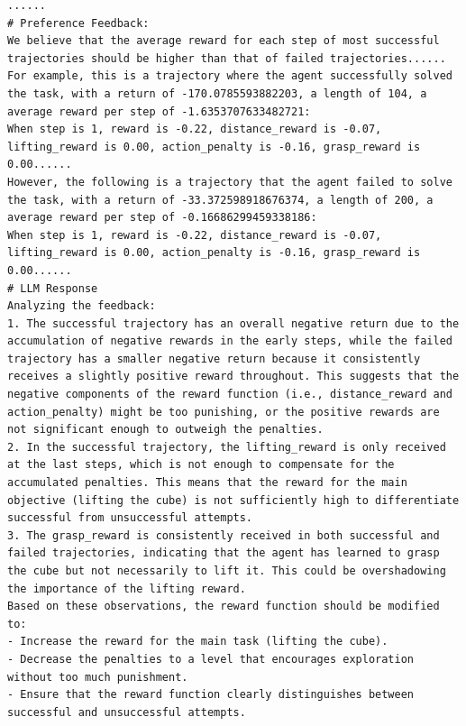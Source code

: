 \documentclass{article}
\theoremstyle{plain}
\theoremstyle{definition}
\theoremstyle{remark}
\begin{document}
\begin{table}[!ht]
\centering
\caption{The code generated after $2$ introspection iteration on \textit{Lift Cube}.}
\begin{tcolorbox}
\begin{lstlisting}[breaklines]
......
# Preference Feedback:
We believe that the average reward for each step of most successful trajectories should be higher than that of failed trajectories......
For example, this is a trajectory where the agent successfully solved the task, with a return of -170.0785593882203, a length of 104, a average reward per step of -1.6353707633482721:
When step is 1, reward is -0.22, distance_reward is -0.07, lifting_reward is 0.00, action_penalty is -0.16, grasp_reward is 0.00......
However, the following is a trajectory that the agent failed to solve the task, with a return of -33.372598918676374, a length of 200, a average reward per step of -0.16686299459338186:
When step is 1, reward is -0.22, distance_reward is -0.07, lifting_reward is 0.00, action_penalty is -0.16, grasp_reward is 0.00......
# LLM Response
Analyzing the feedback:
1. The successful trajectory has an overall negative return due to the accumulation of negative rewards in the early steps, while the failed trajectory has a smaller negative return because it consistently receives a slightly positive reward throughout. This suggests that the negative components of the reward function (i.e., distance_reward and action_penalty) might be too punishing, or the positive rewards are not significant enough to outweigh the penalties.
2. In the successful trajectory, the lifting_reward is only received at the last steps, which is not enough to compensate for the accumulated penalties. This means that the reward for the main objective (lifting the cube) is not sufficiently high to differentiate successful from unsuccessful attempts.
3. The grasp_reward is consistently received in both successful and failed trajectories, indicating that the agent has learned to grasp the cube but not necessarily to lift it. This could be overshadowing the importance of the lifting reward.
Based on these observations, the reward function should be modified to:
- Increase the reward for the main task (lifting the cube).
- Decrease the penalties to a level that encourages exploration without too much punishment.
- Ensure that the reward function clearly distinguishes between successful and unsuccessful attempts.


\end{lstlisting}
\end{tcolorbox}
\end{table}
\end{document}
